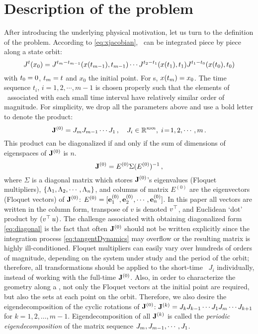 \documentclass[final,leqno,onefignum,onetabnum]{siamltexmm}
\begin{document}
\section{Description of the problem}
\label{sect:problem}

After introducing the underlying physical motivation, let us turn
to the definition of the problem. According to
\eqref{eq:xjacobian}, \JacobianM\ can be integrated piece by
piece along a state orbit:
\[
J^{t}(x_0) =
J^{t_{m}-t_{m-1}}(x(t_{m-1}) ,t_{m-1})
\cdots
J^{t_{2}-t_{1}}(x(t_{1}) ,t_{1})
J^{t_{1}-t_{0}}(x(t_{0}) ,t_{0})
\]
with $t_{0}=0$, $t_{m}=t$ and $x_0$ the initial point. For \po s,
$x(t_{m}) = x_0$.
The time sequence $t_i$, $i=1,2,\cdots, m-1$ is
chosen properly such that the elements of
\JacobianM\ associated with each small time interval have relatively
similar order of magnitude.
For simplicity, we drop all the parameters above and use a bold
letter to denote the product:
\begin{equation}
\ps{\jMps}{0}=\jMps_{m}\jMps_{m-1}\cdots \jMps_{1}\,,\quad
\jMps_{i}\in \mathbb{R}^{n\!\times\! n},\; i\!=\!1,2,\cdots,m
\,.
\label{eq:problem}
\end{equation}
This product can be diagonalized if and only if the sum of
dimensions of eigenspaces of $\mathbf{J}^{(0)}$ is $n$.
\begin{equation}
  \label{eq:diagonal}
  \ps{\jMps}{0}=E^{(0)}\Sigma(E^{(0)})^{-1}
  \,,
\end{equation}
where $\Sigma$ is a diagonal matrix which stores $\mathbf{J}^{(0)}$'s
eigenvalues (Floquet multipliers),
$\{ \Lambda_{1}, \Lambda_{2}, \cdots, \Lambda_{n}\}$, and
columns of matrix $E^{(0)}$ are the eigenvectors (Floquet vectors)
of $\mathbf{J}^{(0)}$:
$E^{(0)}=[{\bf e}_{1}^{(0)}, {\bf e}_{2}^{(0)}, \cdots, {\bf e}_{n}^{(0)}]$. In this paper all
vectors are written in the column form, transpose of $v$ is denoted
${v}{}^\top$, and Euclidean `dot' product by $({v}{}^\top\,u)$. The
challenge associated with obtaining diagonalized form \eqref{eq:diagonal}
is the fact that often $\mathbf{J}^{(0)}$ should not be written
explicitly since the integration process \eqref{eq:tangentDynamics} may overflow
or the resulting matrix is highly ill-conditioned.
Floquet multipliers can easily vary over {hundreds of}
orders of magnitude,
depending on the system under study and the period of the orbit;
therefore, all transformations should be applied to the short-time
\JacobianMs\ $J_i$ individually, instead of working with the full-time
$\mathbf{J}^{(0)}$.
Also, in order to characterize
the geometry along a \po, not only the Floquet
vectors at the initial point are required, but also the
sets at each point on the orbit. Therefore, we also desire
the eigendecomposition of the cyclic rotations of $\mathbf{J}^{(0)}$:
$\mathbf{J}^{(k)}=J_{k}J_{k-1}\cdots J_{1}J_{m}\cdots
J_{k+1}$ for $k=1,2,\dots,m\!-\!1$. Eigendecomposition of all
$\mathbf{J}^{(k)}$ is called the \emph{periodic eigendecomposition} of the
matrix sequence $J_{m}, J_{m-1}, \cdots ,J_{1}$.
\end{document}
